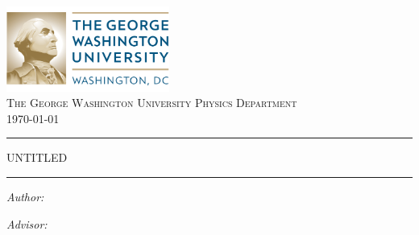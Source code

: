 \documentclass{article}
\begin{document}
\noindent

\begin{center}

\includegraphics[width=0.4\textwidth]{gwulogo}~\\[1cm]

\textsc{\LARGE The George Washington University\vspace{.2cm}
Physics Department}\\[.4cm]

{\large \today}
\vspace{.5cm}

\hrule \vspace{.4cm}
{ \huge \bfseries  

UNTITLED

\vspace{0.2cm} }
\hrule \vspace{1.5cm}

\begin{minipage}{0.4\textwidth}
\begin{flushleft} \large
\emph{Author:}\\

\footnotemark[1]

\end{flushleft}
\end{minipage}
\begin{minipage}{0.4\textwidth}
\begin{flushright} \large
\emph{Advisor:} \\
\footnotemark[2]
\end{flushright}
\end{minipage}
\end{center}

\vspace{.4cm}


\vfill
{} 

\end{document}
